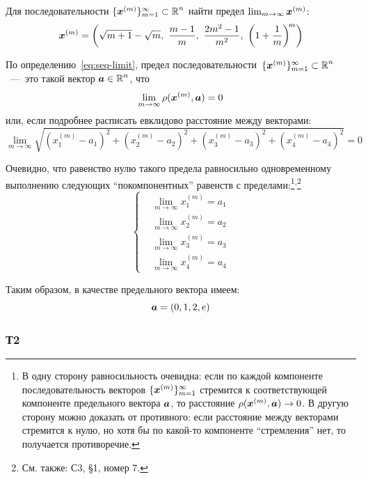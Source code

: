 \documentclass[a4paper,12pt]{article}
\begin{document}
  Для последовательности $\{\bds x^{(m)}\}_{m = 1}^{\infty} \hm\subset \RR^n$ найти предел $\lim_{m \to \infty} \boldsymbol x^{(m)}$:
  \[
    \bds x^{(m)} = \left(
      \sqrt{m + 1} - \sqrt{m},\ 
      \frac{m - 1}{m},\ 
      \frac{2m^2 - 1}{m^2},\ 
      \left(1 + \frac{1}{m}\right)^{\! m}
    \right)
  \]
  
  \begin{solution}
    По определению~\eqref{eq:seq-limit}, предел последовательности~$\{\bds x^{(m)}\}_{m = 1}^{\infty} \hm\subset \RR^n$~---~это такой вектор $\bds a \hm\in \RR^n$, что
    \[
      \lim_{m \to \infty} \rho(\boldsymbol x^{(m)}, \boldsymbol a) = 0
    \]
    или, если подробнее расписать евклидово расстояние между векторами:
    \[
      \lim_{m \to \infty} \sqrt{
        \left(x^{(m)}_1 - a_1\right)^2
        + \left(x^{(m)}_2 - a_2\right)^2
        + \left(x^{(m)}_3 - a_3\right)^2
        + \left(x^{(m)}_4 - a_4\right)^2} = 0
    \]

    Очевидно, что равенство нулю такого предела равносильно одновременному выполнению следующих ``покомпонентных'' равенств с пределами:\footnote{
      В одну сторону равносильность очевидна: если по каждой компоненте последовательность векторов $\{\boldsymbol x^{(m)}\}_{m = 1}^{\infty}$ стремится к соответствующей компоненте предельного вектора $\boldsymbol a$, то расстояние $\rho(\bds x^{(m)}, \bds a) \hm\to 0$.
      В другую сторону можно доказать от противного: если расстояние между векторами стремится к нулю, но хотя бы по какой-то компоненте ``стремления'' нет, то получается противоречие.
    }\textsuperscript{,}\footnote{
      См. также: С3, \S 1, номер 7.
    }
    \[
      \left\{
        \begin{aligned}
          &\lim_{m \to \infty} x^{(m)}_1 = a_1\\
          &\lim_{m \to \infty} x^{(m)}_2 = a_2\\
          &\lim_{m \to \infty} x^{(m)}_3 = a_3\\
          &\lim_{m \to \infty} x^{(m)}_4 = a_4
        \end{aligned}
      \right.
    \]

    Таким образом, в качестве предельного вектора имеем:
    \[
      \boldsymbol a = \left(
        0, 1, 2, e
      \right)
    \]
  \end{solution}

  
  \subsubsection{Т2}
\end{document}

